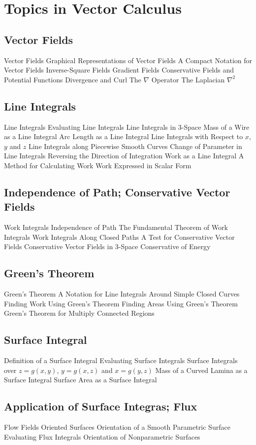 \documentclass[]{article}
\begin{document}
\section{Topics in Vector Calculus}
\subsection{Vector Fields}
Vector Fields
Graphical Representations of Vector Fields
A Compact Notation for Vector Fields
Inverse-Square Fields
Gradient Fields
Conservative Fields and Potential Functions
Divergence and Curl
The $\nabla$ Operator
The Laplacian $\nabla^2$
\subsection{Line Integrals}
Line Integrals
Evaluating Line Integrals
Line Integrals in 3-Space
Mass of a Wire as a Line Integral
Arc Length as a Line Integral
Line Integrals with Respect to $x$, $y$ and $z$
Line Integrals along Piecewise Smooth Curves
Change of Parameter in Line Integrals
Reversing the Direction of Integration
Work as a Line Integral
A Method for Calculating Work
Work Expressed in Scalar Form
\subsection{Independence of Path; Conservative Vector Fields}
Work Integrals
Independence of Path
The Fundamental Theorem of Work Integrals
Work Integrals Along Closed Paths
A Test for Conservative Vector Fields
Conservative Vector Fields in 3-Space
Conservative of Energy
\subsection{Green's Theorem}
Green's Theorem
A Notation for Line Integrals Around Simple Closed Curves
Finding Work Using Green's Theorem
Finding Areas Using Green's Theorem
Green's Theorem for Multiply Connected Regions
\subsection{Surface Integral}
Definition of a Surface Integral
Evaluating Surface Integrals
Surface Integrals over $z=g(x,y)$, $y=g(x,z)$ and $x=g(y,z)$
Mass of a Curved Lamina as a Surface Integral
Surface Area as a Surface Integral
\subsection{Application of Surface Integras; Flux}
Flow Fields
Oriented Surfaces
Orientation of a Smooth Parametric Surface
Evaluating Flux Integrals
Orientation of Nonparametric Surfaces
\end{document}
